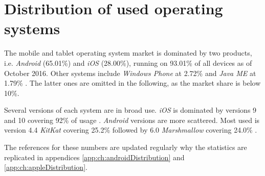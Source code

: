 \section{Distribution of used operating systems}\label{preStudy:devices}

The mobile and tablet operating system market is dominated by two products, i.e. \textit{Android} (65.01\%) and \textit{iOS} (28.00\%), running on 93.01\% of all devices as of October 2016.
Other systems include \textit{Windows Phone} at 2.72\% and \textit{Java ME} at 1.79\% \citep{preStudy:devices:companies}.
The latter ones are omitted in the following, as the market share is below 10\%.

Several versions of each system are in broad use.
\textit{iOS} is dominated by versions 9 and 10 covering 92\% of usage \citep{preStudy:devices:apple}.
\textit{Android} versions are more scattered.
Most used is version 4.4 \textit{KitKat} covering 25.2\% followed by 6.0 \textit{Marshmallow} covering 24.0\% \citep{preStudy:devices:android}.

The references for these numbers are updated regularly why the statistics are replicated in appendices \ref{app:ch:androidDistribution} and \ref{app:ch:appleDistribution}.

